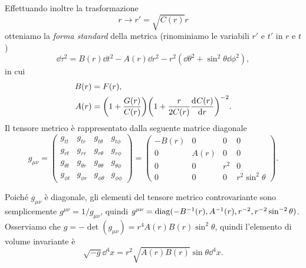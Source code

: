 Effettuando inoltre la trasformazione 
\begin{equation}
  r \to r' = \sqrt{C(r)}r
\end{equation}
otteniamo la \emph{forma standard} della
metrica (rinominiamo le variabili $r'$ e $t'$ in $r$ e $t$)
\begin{equation}
  \label{eq:metrica-standard}
  \dd\tau^{2} = B(r)\dd t^{2} - A(r)\dd r^{2} - r^{2}(\dd\theta^{2} +
  \sin^{2}\theta \dd\phi^{2}),
\end{equation}
in cui
\begin{subequations}
  \begin{align}
    B(r) &= F(r), \\
    A(r) &= \bigg(1 + \frac{G(r)}{C(r)} \bigg) \bigg( 1 + \frac{r}{2C(r)}
           \frac{{\mathop{}\!\mathrm{d}^{}}C(r)}{\mathop{}\!\mathrm{d} {r}^{}} \bigg)^{-2}.
  \end{align}
\end{subequations}
Il tensore metrico è rappresentato dalla seguente matrice diagonale
\begin{equation}
  g_{\mu\nu} =
  \begin{pmatrix}
    g_{tt}       & g_{tr}       & g_{t\theta}      & g_{t\phi}      \\
    g_{rt}       & g_{rr}       & g_{r\theta}      & g_{r\phi}      \\
    g_{\theta t} & g_{\theta r} & g_{\theta\theta} & g_{\theta\phi} \\
    g_{\phi t}   & g_{\phi r}   & g_{\phi\theta}   & g_{\phi\phi}
  \end{pmatrix}
  =
  \begin{pmatrix}
    -B(r) & 0    & 0     & 0 \\
    0     & A(r) & 0     & 0 \\
    0     & 0    & r^{2} & 0 \\
    0     & 0    & 0     & r^{2}\sin^{2}\theta
  \end{pmatrix}.
\end{equation}

Poiché $g_{\mu\nu}$ è diagonale, gli elementi del tensore metrico controvariante
sono semplicemente $g^{\mu\nu} = 1/g_{\mu\nu}$, quindi
$g^{\mu\nu} = \operatorname{diag}(-B^{-1}(r), A^{-1}(r), r^{-2}, r^{-2}\sin^{-2}\theta)$.
Osserviamo che $g = -\det(g_{\mu\nu}) = r^{4}A(r)B(r)\sin^{2}\theta$, quindi
l'elemento di volume invariante è
\begin{equation}
  \sqrt{-g} \dd^{4} x = r^{2}\sqrt{A(r) B(r)} \sin\theta \dd^{4} x.
\end{equation}

